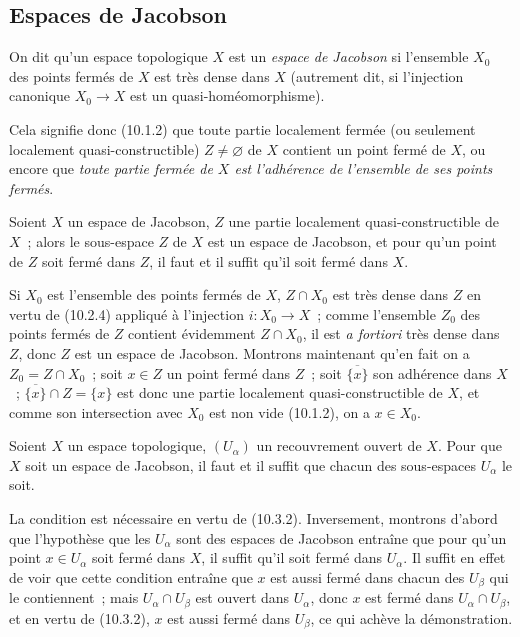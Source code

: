 \subsection{Espaces de Jacobson}
\label{subsection:IV.10.3-fr}

\begin{definition}[10.3.1]
\label{IV.10.3.1-fr}
On dit qu'un espace topologique $X$ est un \emph{espace de Jacobson} si
l'ensemble $X_0$ des points fermés de $X$ est très dense dans $X$ (autrement
dit, si l'injection canonique $X_0\to X$ est un
quasi-homéomorphisme).
\end{definition}

Cela signifie donc (10.1.2) que toute partie localement fermée (ou seulement
localement quasi-constructible) $Z\neq\varnothing$ de $X$ contient un point
fermé de $X$, ou encore que \emph{toute partie fermée de $X$ est l'adhérence
de l'ensemble de ses points fermés}.

\begin{proposition}[10.3.2]
\label{IV.10.3.2-fr}
Soient $X$ un espace de Jacobson, $Z$ une partie localement
quasi-constructible de $X$~; alors le sous-espace $Z$ de $X$ est un espace de
Jacobson, et pour qu'un point de $Z$ soit fermé dans $Z$, il faut et il suffit
qu'il soit fermé dans $X$.
\end{proposition}

Si $X_0$ est l'ensemble des points fermés de $X$, $Z\cap X_0$ est très dense
dans $Z$ en vertu de (10.2.4) appliqué à l'injection $i:X_0\to X$~; comme
l'ensemble $Z_0$ des points fermés de $Z$ contient évidemment $Z\cap X_0$,
il est \emph{a fortiori} très dense dans $Z$, donc $Z$ est un espace de
Jacobson. Montrons maintenant qu'en fait on a $Z_0=Z\cap X_0$~; soit $x\in Z$
un point fermé dans $Z$~; soit $\overline{\{x\}}$ son adhérence dans $X$~;
$\overline{\{x\}}\cap Z=\{x\}$ est donc une partie localement
quasi-constructible de $X$, et comme son intersection avec $X_0$ est non vide
(10.1.2), on a $x\in X_0$.

\begin{proposition}[10.3.3]
\label{IV.10.3.3-fr}
Soient $X$ un espace topologique, $(U_\alpha)$ un recouvrement ouvert de $X$.
Pour que $X$ soit un espace de Jacobson, il faut et il suffit que chacun des
sous-espaces $U_\alpha$ le soit.
\end{proposition}

La condition est nécessaire en vertu de (10.3.2). Inversement, montrons
d'abord que l'hypothèse que les $U_\alpha$ sont des espaces de Jacobson
entraîne que pour qu'un point $x\in U_\alpha$ soit fermé dans $X$, il suffit
qu'il soit fermé dans $U_\alpha$. Il suffit en effet de voir que cette
condition entraîne que $x$ est aussi fermé dans chacun des $U_\beta$ qui le
contiennent~; mais $U_\alpha\cap U_\beta$ est ouvert dans $U_\alpha$, donc $x$
est fermé dans $U_\alpha\cap U_\beta$, et en vertu de (10.3.2), $x$ est aussi
fermé dans $U_\beta$, ce qui achève la démonstration.

